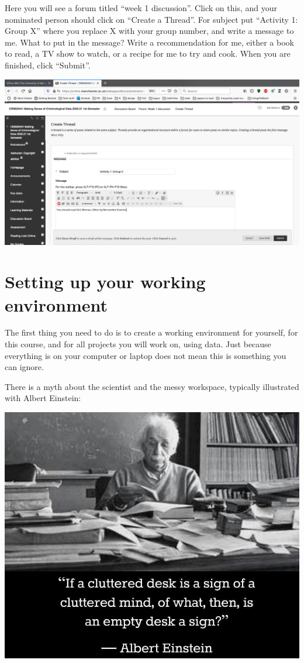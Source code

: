 \documentclass[
]{book}
\begin{document}
Here you will see a forum titled ``week 1 discussion''. Click on this, and your nominated person should click on ``Create a Thread''. For subject put ``Activity 1: Group X'' where you replace X with your group number, and write a message to me. What to put in the message? Write a recommendation for me, either a book to read, a TV show to watch, or a recipe for me to try and cook. When you are finished, click ``Submit''.

\includegraphics{imgs/db_activity.png}

\hypertarget{setting-up-your-working-environment}{%
\section{Setting up your working environment}\label{setting-up-your-working-environment}}

The first thing you need to do is to create a working environment for yourself, for this course, and for all projects you will work on, using data. Just because everything is on your computer or laptop does not mean this is something you can ignore.

There is a myth about the scientist and the messy workspace, typically illustrated with Albert Einstein:

\includegraphics[width=13.33in]{imgs/einstein_desk}
\end{document}
